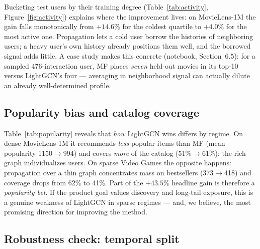 \documentclass[11pt]{article}
\begin{document}
Bucketing test users by their training degree (Table~\ref{tab:activity},
Figure~\ref{fig:activity}) explains where the improvement lives: on
MovieLens-1M the gain falls monotonically from $+14.6\%$ for the coldest
quartile to $+4.0\%$ for the most active one. Propagation lets a cold user
borrow the histories of neighboring users; a heavy user's own history already
positions them well, and the borrowed signal adds little. A case study makes
this concrete (notebook, Section~6.5): for a sampled 476-interaction user,
MF places \emph{seven} held-out movies in its top-10 versus LightGCN's four
--- averaging in neighborhood signal can actually dilute an already
well-determined profile.

\subsection{Popularity bias and catalog coverage}

\begin{table}[h]\centering

\caption{Mean training popularity of top-10 recommendations and share of the
catalog that ever appears in a top-10 list.}
\label{tab:popularity}
\end{table}

Table~\ref{tab:popularity} reveals that \emph{how} LightGCN wins differs by
regime. On dense MovieLens-1M it recommends \emph{less} popular items than MF
(mean popularity 1150$\rightarrow$994) and covers \emph{more} of the catalog
(51\%$\rightarrow$61\%): the rich graph individualizes users. On sparse Video
Games the opposite happens: propagation over a thin graph concentrates mass
on bestsellers (373$\rightarrow$418) and coverage drops from 62\% to 41\%.
Part of the $+43.5\%$ headline gain is therefore a \emph{popularity bet}. If
the product goal values discovery and long-tail exposure, this is a genuine
weakness of LightGCN in sparse regimes --- and, we believe, the most
promising direction for improving the method.

\subsection{Robustness check: temporal split}\label{sec:temporal}

\begin{table}[h]\centering

\caption{Random vs.\ temporal (per-user leave-last-10\%) splits, all four
methods. Absolute numbers drop sharply under the temporal protocol; the
LightGCN-over-MF gain survives on the sparse dataset but vanishes on the
dense one.}
\label{tab:temporal}
\end{table}
\end{document}
